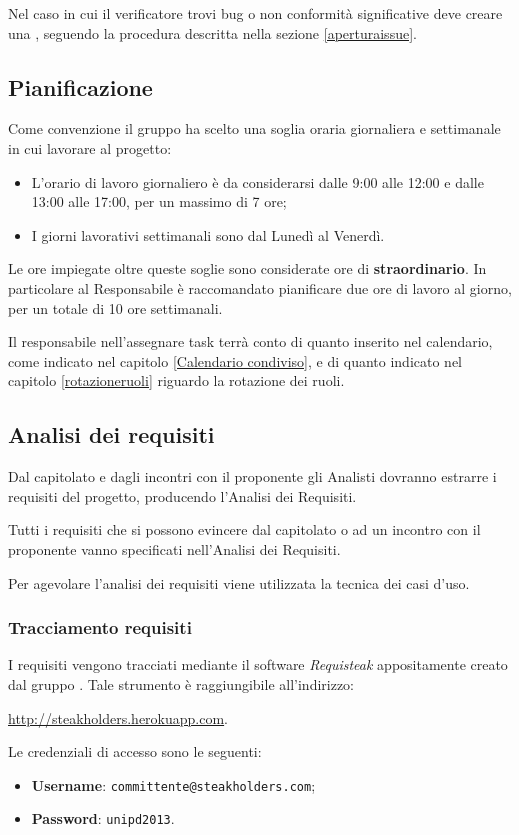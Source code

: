 Nel caso in cui il verificatore trovi bug o non conformità significative deve creare una , seguendo la procedura descritta nella sezione \ref{aperturaissue}.

\subsection{Pianificazione}

Come convenzione il gruppo ha scelto una soglia oraria giornaliera e settimanale in cui lavorare al progetto:
		
		\begin{itemize}
			\item L'orario di lavoro giornaliero è da considerarsi dalle 9:00 alle 12:00 e dalle 13:00 alle 17:00, per un massimo di 7 ore;
			\item I giorni lavorativi settimanali sono dal Lunedì al Venerdì.
		\end{itemize}
		
		Le ore impiegate oltre queste soglie sono considerate ore di \textbf{straordinario}. In particolare al Responsabile è raccomandato pianificare due ore di lavoro al giorno, per un totale di 10 ore settimanali.
		
		Il responsabile nell'assegnare task terrà conto di quanto inserito nel calendario, come indicato nel capitolo \ref{Calendario condiviso}, e di quanto indicato nel capitolo \ref{rotazioneruoli} riguardo la rotazione dei ruoli. 
		
\subsection{Analisi dei requisiti}

Dal capitolato e dagli incontri con il proponente gli Analisti dovranno estrarre i requisiti del progetto, producendo l'Analisi dei Requisiti.

Tutti i requisiti che si possono evincere dal capitolato o ad un incontro con il proponente vanno specificati nell'Analisi dei Requisiti.

Per agevolare l'analisi dei requisiti viene utilizzata la tecnica dei casi d'uso.

    \subsubsection{Tracciamento requisiti}
     I requisiti vengono tracciati mediante il software \emph{Requisteak} appositamente creato dal gruppo \GroupName{}. Tale strumento è raggiungibile all'indirizzo:
     \begin{center}
         \url{http://steakholders.herokuapp.com}.
     \end{center} 
     Le credenziali di accesso sono le seguenti:
     \begin{itemize}
        \item \textbf{Username}: \texttt{committente@steakholders.com};
        \item \textbf{Password}: \texttt{unipd2013}.
     \end{itemize}
     
